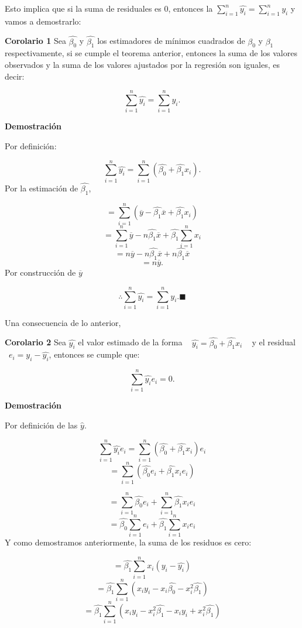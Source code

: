 \documentclass[
  a4paper,
  oneside,
  openany]{book}
\begin{document}
Esto implica que si la suma de residuales es 0, entonces la \(\sum_{i=1}^{n}\hat{y_{i}}=\sum_{i=1}^{n}y_{i}\) y vamos a demostrarlo:

\textbf{Corolario 1} Sea \(\hat{\beta_{0}}\) y \(\hat{\beta_{1}}\) los estimadores de mínimos cuadrados de \(\beta_{0}\) y \(\beta_{1}\) respectivamente, si se cumple el teorema anterior, entonces la suma de los valores observados y la suma de los valores ajustados por la regresión son iguales, es decir:

\[\sum_{i=1}^{n}\hat{y_{i}}=\sum_{i=1}^{n}y_{i}.\]

\textbf{Demostración}

Por definición:

\[\sum_{i=1}^{n}\hat{y_{i}}=\sum_{i=1}^{n}\left(\hat{\beta_{0}}+\hat{\beta_{1}}x_{i}\right).\]
Por la estimación de \(\hat{\beta_{1}}\),

\[=\sum_{i=1}^{n}\left(\overline{y}-\hat{\beta_{1}}\overline{x}+\hat{\beta_{1}}x_{i}\right)\]
\[=\sum_{i=1}^{n}\overline{y}-n\hat{\beta_{1}}\overline{x}+\hat{\beta_{1}}\sum_{i=1}^{n}x_{i}\]
\[=n\overline{y}-n\hat{\beta_{1}}\overline{x}+n\hat{\beta_{1}}\overline{x}\]
\[=n\overline{y}.\]
Por construcción de \(\overline{y}\)

\[\therefore \sum_{i=1}^{n}\hat{y_{i}}=\sum_{i=1}^{n}y_{i}. \blacksquare\]

Una consecuencia de lo anterior,

\textbf{Corolario 2} Sea \(\hat{y_{i}}\) el valor estimado de la forma ~ \(\hat{y_{i}}=\hat{\beta_{0}}+\hat{\beta_{1}}x_{i}\) ~ y el residual ~\(e_{i}=y_{i}-\hat{y_{i}}\), entonces se cumple que:

\[\sum_{i=1}^{n}\hat{y_{i}}e_{i}=0.\]

\textbf{Demostración}

Por definición de las \(\hat{y}.\)

\[\sum_{i=1}^{n}\hat{y_{i}}e_{i}=\sum_{i=1}^{n}(\hat{\beta_{0}}+\hat{\beta_{1}}x_{i})e_{i}\]
\[=\sum_{i=1}^{n}\left(\hat{\beta_{0}}e_{i}+\hat{\beta_{1}}x_{i}e_{i}\right)\]

\[=\sum_{i=1}^{n}\hat{\beta_{0}}e_{i}+\sum_{i=1}^{n}\hat{\beta_{1}}x_{i}e_{i}\]
\[=\hat{\beta_{0}}\sum_{i=1}^{n}e_{i}+\hat{\beta_{1}}\sum_{i=1}^{n}x_{i}e_{i}\]
Y como demostramos anteriormente, la suma de los residuos es cero:

\[=\hat{\beta_{1}}\sum_{i=1}^{n}x_{i}(y_{i}-\hat{y_{i}})\]
\[=\hat{\beta_{1}}\sum_{i=1}^{n}\left(x_{i}y_{i}-x_{i}\hat{\beta_{0}}-x_{i}^{2}\hat{\beta_{1}}\right)\]
\[=\hat{\beta_{1}}\sum_{i=1}^{n}\left(x_{i}y_{i}-x_{i}^2\hat{\beta_{1}}-x_{i}y_{i}+x_{i}^{2}\hat{\beta_{1}}\right)\]
\end{document}

